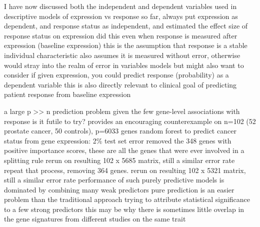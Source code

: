 \begin{outline}
\1 I have now discussed both the independent and dependent variables used in descriptive models of expression vs response
    \2 so far, always put expression as dependent, and response status as independent, and estimated the effect size of response status on expression
    \2 did this even when response is measured after expression (baseline expression)
        \3 this is the assumption that response is a stable individual characteristic
        \3 also assumes it is measured without error, otherwise would stray into the realm of error in variables models
    \2 but might also want to consider if given expression, you could predict response (probability) as a dependent variable
    \2 this is also directly relevant to clinical goal of predicting patient response from baseline expression
    
\1 a large p >> n prediction problem
    \2 given the few gene-level associations with response is it futile to try?
    \2 \textcite{efron2020PredictionEstimationAttribution} provides an encouraging counterexample on n=102 (52 prostate cancer, 50 controls), p=6033 genes
        \3 random forest to predict cancer status from gene expression: 2\% test set error
        \3 removed the 348 genes with positive importance scores, these are all the genes that were ever involved in a splitting rule
        \3 rerun on resulting 102 x 5685 matrix, still a similar error rate
        \3 repeat that process, removing 364 genes. rerun on resulting 102 x 5321 matrix, still a similar error rate
    \2 performance of such purely predictive models is dominated by combining many weak predictors
    \2 pure prediction is an easier problem than the traditional approach trying to attribute statistical significance to a few strong predictors
    \2 this may be why there is sometimes little overlap in the gene signatures from different studies on the same trait



\end{outline}
